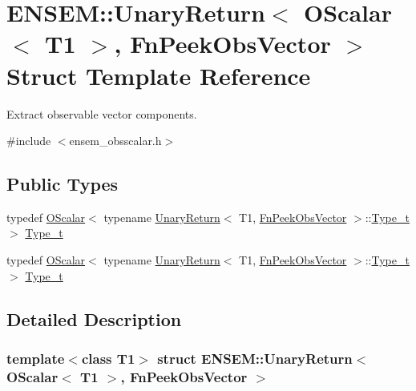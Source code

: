 \hypertarget{structENSEM_1_1UnaryReturn_3_01OScalar_3_01T1_01_4_00_01FnPeekObsVector_01_4}{}\section{E\+N\+S\+EM\+:\+:Unary\+Return$<$ O\+Scalar$<$ T1 $>$, Fn\+Peek\+Obs\+Vector $>$ Struct Template Reference}
\label{structENSEM_1_1UnaryReturn_3_01OScalar_3_01T1_01_4_00_01FnPeekObsVector_01_4}


Extract observable vector components.  




{\ttfamily \#include $<$ensem\+\_\+obsscalar.\+h$>$}

\subsection*{Public Types}
\begin{DoxyCompactItemize}
\item 
typedef \mbox{\hyperlink{classENSEM_1_1OScalar}{O\+Scalar}}$<$ typename \mbox{\hyperlink{structENSEM_1_1UnaryReturn}{Unary\+Return}}$<$ T1, \mbox{\hyperlink{structENSEM_1_1FnPeekObsVector}{Fn\+Peek\+Obs\+Vector}} $>$\+::\mbox{\hyperlink{structENSEM_1_1UnaryReturn_3_01OScalar_3_01T1_01_4_00_01FnPeekObsVector_01_4_afbb417d857c687872160aa2c33bf13a2}{Type\+\_\+t}} $>$ \mbox{\hyperlink{structENSEM_1_1UnaryReturn_3_01OScalar_3_01T1_01_4_00_01FnPeekObsVector_01_4_afbb417d857c687872160aa2c33bf13a2}{Type\+\_\+t}}
\item 
typedef \mbox{\hyperlink{classENSEM_1_1OScalar}{O\+Scalar}}$<$ typename \mbox{\hyperlink{structENSEM_1_1UnaryReturn}{Unary\+Return}}$<$ T1, \mbox{\hyperlink{structENSEM_1_1FnPeekObsVector}{Fn\+Peek\+Obs\+Vector}} $>$\+::\mbox{\hyperlink{structENSEM_1_1UnaryReturn_3_01OScalar_3_01T1_01_4_00_01FnPeekObsVector_01_4_afbb417d857c687872160aa2c33bf13a2}{Type\+\_\+t}} $>$ \mbox{\hyperlink{structENSEM_1_1UnaryReturn_3_01OScalar_3_01T1_01_4_00_01FnPeekObsVector_01_4_afbb417d857c687872160aa2c33bf13a2}{Type\+\_\+t}}
\end{DoxyCompactItemize}


\subsection{Detailed Description}
\subsubsection*{template$<$class T1$>$\newline
struct E\+N\+S\+E\+M\+::\+Unary\+Return$<$ O\+Scalar$<$ T1 $>$, Fn\+Peek\+Obs\+Vector $>$}

